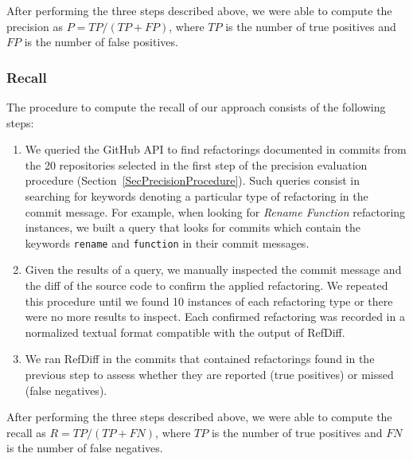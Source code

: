 After performing the three steps described above, we were able to compute the precision as $P = \mathit{TP} / (\mathit{TP} + \mathit{FP})$, where $\mathit{TP}$ is the number of true positives and $\mathit{FP}$ is the number of false positives.



\subsubsection{Recall}

The procedure to compute the recall of our approach consists of the following steps:

\begin{enumerate}  
\item We queried the GitHub API to find refactorings documented in commits from the 20 repositories selected in the first step of the precision evaluation procedure (Section~\ref{SecPrecisionProcedure}). Such queries consist in searching for keywords denoting a particular type of refactoring in the commit message. For example, when looking for \emph{Rename Function} refactoring instances, we built a query that looks for commits which contain the keywords \texttt{rename} and \texttt{function} in their commit messages.

\item Given the results of a query, we manually inspected the commit message and the diff of the source code to confirm the applied refactoring. We repeated this procedure until we found 10 instances of each refactoring type or there were no more results to inspect. Each confirmed refactoring was recorded in a normalized textual format compatible with the output of RefDiff.

\item We ran RefDiff in the commits that contained refactorings found in the previous step to assess whether they are reported (true positives) or missed (false negatives). 

\end{enumerate}

After performing the three steps described above, we were able to compute the recall as $R = \mathit{TP} / (\mathit{TP} + \mathit{FN})$, where $\mathit{TP}$ is the number of true positives and $\mathit{FN}$ is the number of false negatives.


